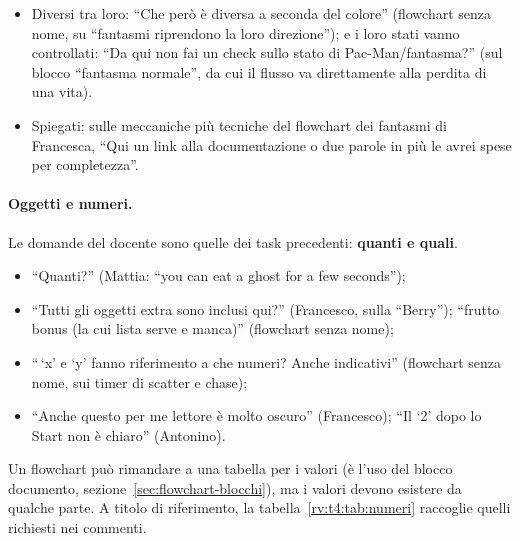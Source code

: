\begin{itemize}
{        flowchart completo riporta entrambe le cose: l'inversione e la regola
        con cui si sceglie la svolta.}
  \item Diversi tra loro: ``Che però è diversa a seconda del colore''
        (flowchart senza nome, su ``fantasmi riprendono la loro direzione'');
        e i loro stati vanno controllati: ``Da qui non fai un check sullo stato
        di Pac-Man/fantasma?'' (sul blocco ``fantasma normale'', da cui il
        flusso va direttamente alla perdita di una vita).
  \item Spiegati: sulle meccaniche più tecniche del flowchart dei fantasmi di
        Francesca, ``Qui un link alla documentazione o due parole in più le
        avrei spese per completezza''.
\end{itemize}

\paragraph{Oggetti e numeri.} Le domande del docente sono quelle dei task
precedenti: \textbf{quanti e quali}.
\begin{itemize}
  \item ``Quanti?'' (Mattia: ``you can eat a ghost for a few seconds'');
  \item ``Tutti gli oggetti extra sono inclusi qui?'' (Francesco, sulla
        ``Berry''); ``frutto bonus (la cui lista serve e manca)'' (flowchart
        senza nome);
  \item ``\,`x' e `y' fanno riferimento a che numeri? Anche indicativi''
        (flowchart senza nome, sui timer di scatter e chase);
  \item ``Anche questo per me lettore è molto oscuro'' (Francesco); ``Il `2'
        dopo lo Start non è chiaro'' (Antonino).
\end{itemize}
Un flowchart può rimandare a una tabella per i valori (è l'uso del blocco
documento, sezione~\ref{sec:flowchart-blocchi}), ma i valori devono
esistere da qualche parte. A titolo di riferimento, la
tabella~\ref{rv:t4:tab:numeri} raccoglie quelli richiesti nei commenti.

